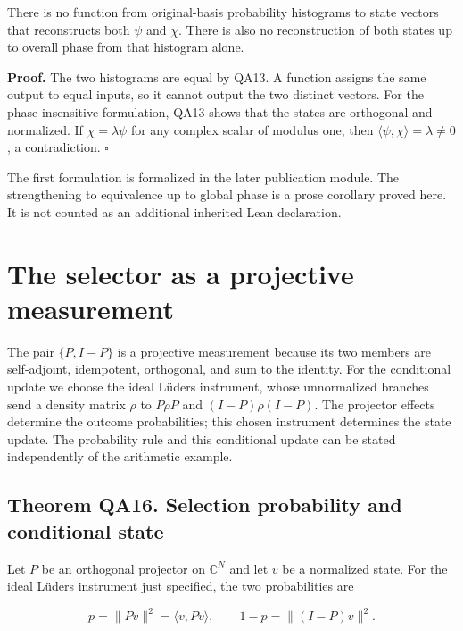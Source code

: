 There is no function from original-basis probability histograms to state
vectors that reconstructs both \(\psi\) and \(\chi\). There is also no
reconstruction of both states up to overall phase from that histogram
alone.

\textbf{Proof.} The two histograms are equal by QA13. A function assigns
the same output to equal inputs, so it cannot output the two distinct
vectors. For the phase-insensitive formulation, QA13 shows that the
states are orthogonal and normalized. If \(\chi=\lambda\psi\) for any
complex scalar of modulus one, then
\(\langle\psi,\chi\rangle=\lambda\ne0\), a contradiction. \(\square\)

The first formulation is formalized in the later publication module. The
strengthening to equivalence up to global phase is a prose corollary
proved here. It is not counted as an additional inherited Lean
declaration.

\hypertarget{q:the-selector-as-a-projective-measurement}{%
\section{The selector as a projective
measurement}\label{q:the-selector-as-a-projective-measurement}}

The pair \(\{P,I-P\}\) is a projective measurement because its two
members are self-adjoint, idempotent, orthogonal, and sum to the
identity. For the conditional update we choose the ideal Lüders
instrument, whose unnormalized branches send a density matrix \(\rho\)
to \(P\rho P\) and \((I-P)\rho(I-P)\). The projector effects determine
the outcome probabilities; this chosen instrument determines the state
update. The probability rule and this conditional update can be stated
independently of the arithmetic example.

\hypertarget{q:theorem-qa16.-selection-probability-and-conditional-state}{%
\subsection*{Theorem QA16. Selection probability and conditional
state}\label{q:theorem-qa16.-selection-probability-and-conditional-state}}

Let \(P\) be an orthogonal projector on \(\mathbb C^N\) and let \(v\) be
a normalized state. For the ideal Lüders instrument just specified, the
two probabilities are

\[
p=\|Pv\|^2=\langle v,Pv\rangle,
\qquad 1-p=\|(I-P)v\|^2.
\]

